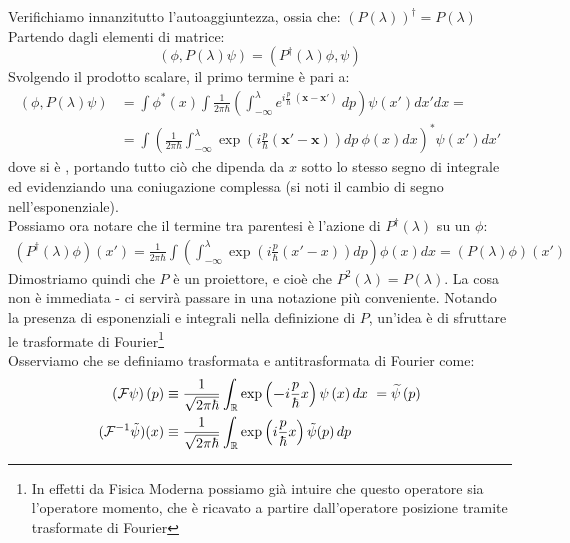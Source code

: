 \documentclass[../../FisicaTeorica.tex]{subfiles}
\begin{document}
Verifichiamo innanzitutto l'autoaggiuntezza, ossia che: $\left(P\left(\lambda\right)\right)^\dag=P\left(\lambda\right)$
Partendo dagli elementi di matrice:
\[
\left(\phi,P\left(\lambda\right)\psi\right)=\left(P^\dag\left(\lambda\right)\phi,\psi\right)
\]
Svolgendo il prodotto scalare, il primo termine è pari a:
\begin{align*}
(\phi, P(\lambda)\psi) &= \int{\phi^*\left(x\right)}\int{\frac{1}{2\pi\hbar}\left(\int_{-\infty}^{\lambda}{e^{i\frac{p}{\hbar}\ \left(\bm{x-x'}\right)}\ }dp\right)\psi\left(x'\right)dx' d x}=\\
&={\int\limits{\left(\frac{1}{2\pi\hbar}\int_{-\infty}^{\lambda}{\exp\left({i\frac{p}{\hbar}\left(\bm{x'-x}\right)}\right )dp\ \phi\left(x\right)dx}\right)}}^*\psi \left(x'\right)dx'
\end{align*}
dove si è , portando tutto ciò che dipenda da $x$ sotto lo stesso segno di integrale ed evidenziando una coniugazione complessa (si noti il cambio di segno nell'esponenziale).\\
Possiamo ora notare che il termine tra parentesi è l'azione di $P^\dag (\lambda)$ su un $\phi$:
\begin{align*}
    \left(P^\dag\left(\lambda\right)\phi\right)\left(x'\right)=\frac{1}{2\pi\hbar}\int{\left(\int_{-\infty}^{\lambda}{\exp\left ({i\frac{p}{\hbar}\left(x'-x\right)}\right )dp}\right)\phi\left(x\right)dx=\left(P\left(\lambda\right)\phi\right)(x')}
\end{align*}
Dimostriamo quindi che $P$ è un proiettore, e cioè che $P^2\left(\lambda\right)=P\left(\lambda\right)$. La cosa non è immediata - ci servirà passare in una notazione più conveniente. Notando la presenza di esponenziali e integrali nella definizione di $P$, un'idea è di sfruttare le trasformate di Fourier\footnote{In effetti da Fisica Moderna possiamo già intuire che questo operatore sia l'operatore momento, che è ricavato a partire dall'operatore posizione tramite trasformate di Fourier}\\
Osserviamo che se definiamo trasformata e antitrasformata di Fourier come:
\begin{align*}
\left(\mathcal{F}\psi\right)\left(p\right)&\equiv\frac{1}{\sqrt{2\pi\hbar}}\int_{\mathbb{R}}
{\exp\left (\bm{-}{i\frac{p}{\hbar}x}\right )\psi\left(x\right)dx\ } = \widetilde{\psi}\left(p\right)\\
(\mathcal{F}^{-1}\tilde{\psi})(x) &\equiv  \frac{1}{\sqrt{2\pi\hbar}}\int_{\mathbb{R}} \exp\left(i\frac{p}{\hbar}x\right) \tilde{\psi}(p)\, dp
\end{align*}
\end{document}
